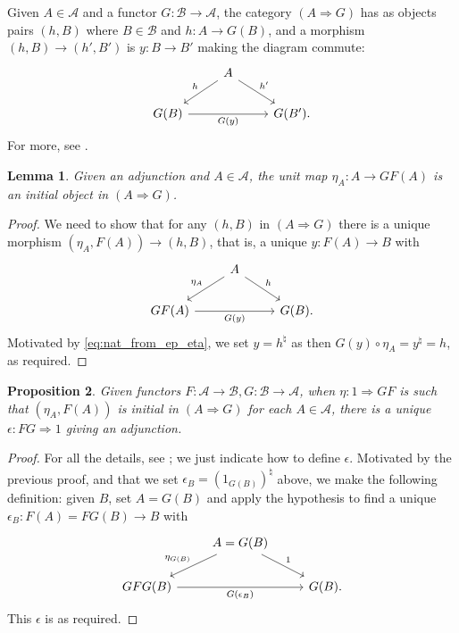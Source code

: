 \documentclass[a4paper,11pt]{article}
\theoremstyle{plain}
\newtheorem{proposition}{Proposition}[section]
\newtheorem{lemma}[proposition]{Lemma}
\theoremstyle{remark}
\newcommand{\mc}[1]{\mathcal{#1}}
\begin{document}
Given $A\in\mc A$ and a functor $G \colon \mc B \to \mc A$, the category $(A\Rightarrow G)$ has as objects pairs $(h,B)$ where $B\in\mc B$ and $h\colon A\to G(B)$, and a morphism $(h,B) \to (h',B')$ is $y\colon B\to B'$ making the diagram commute:
\[\begin{tikzcd}
& A \arrow[ld, "h"'] \arrow[rd,"h'"] \\
G(B) \arrow[rr, "G(y)"'] && G(B'). \end{tikzcd}\]
For more, see \cite[Section~2.3]{Leinster_BasicCatTheory}.

\begin{lemma}
Given an adjunction and $A\in\mc A$, the unit map $\eta_A \colon A \to GF(A)$ is an initial object in $(A\Rightarrow G)$.
\end{lemma}
\begin{proof}
We need to show that for any $(h,B)$ in $(A\Rightarrow G)$ there is a unique morphism $(\eta_A, F(A)) \to (h,B)$, that is, a unique $y \colon F(A) \to B$ with
\[\begin{tikzcd}
& A \arrow[ld, "\eta_A"'] \arrow[rd,"h"] \\
GF(A) \arrow[rr, "G(y)"'] && G(B). \end{tikzcd}\]
Motivated by \eqref{eq:nat_from_ep_eta}, we set $y = h^\natural$ as then $G(y) \circ \eta_A = y^\natural = h$, as required.
\end{proof}

\begin{proposition}
Given functors $F\colon\mc A\to\mc B, G \colon \mc B \to \mc A$, when $\eta \colon 1 \Rightarrow GF$ is such that $(\eta_A, F(A))$ is initial in $(A\Rightarrow G)$ for each $A\in\mc A$, there is a unique $\epsilon \colon FG \Rightarrow 1$ giving an adjunction.
\end{proposition}
\begin{proof}
For all the details, see \cite[Theorem~2.3.6]{Leinster_BasicCatTheory}; we just indicate how to define $\epsilon$.  Motivated by the previous proof, and that we set $\epsilon_B = (1_{G(B)})^\natural$ above, we make the following definition: given $B$, set $A=G(B)$ and apply the hypothesis to find a unique $\epsilon_B \colon F(A) = FG(B) \to B$ with
\[\begin{tikzcd}
& A=G(B) \arrow[ld, "\eta_{G(B)}"'] \arrow[rd,"1"] \\
GFG(B) \arrow[rr, "G(\epsilon_B)"'] && G(B). \end{tikzcd}\]
This $\epsilon$ is as required.
\end{proof}
\end{document}
